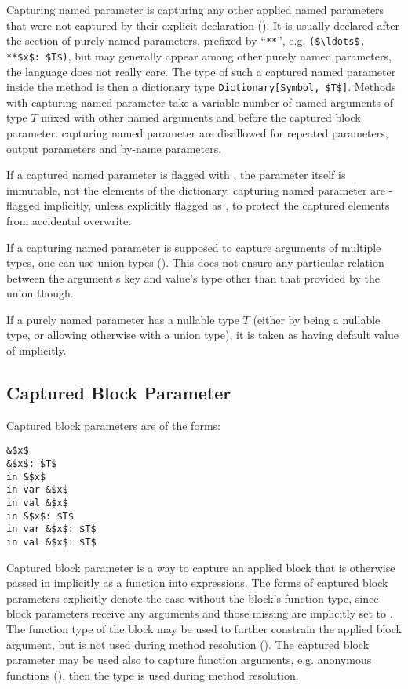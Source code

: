 Capturing named parameter is capturing any other applied named parameters that were not captured by their explicit declaration (). It is usually declared after the section of purely named parameters, prefixed by ``\lstinline!**!'', e.g. \lstinline!($\ldots$, **$x$: $T$)!, but may generally appear among other purely named parameters, the language does not really care. The type of such a captured named parameter inside the method is then a dictionary type \lstinline!Dictionary[Symbol, $T$]!. Methods with capturing named parameter take a variable number of named arguments of type $T$ mixed with other named arguments and before the captured block parameter. capturing named parameter are disallowed for repeated parameters, output parameters and by-name parameters. 

If a captured named parameter is flagged with , the parameter itself is immutable, not the elements of the dictionary. capturing named parameter are -flagged implicitly, unless explicitly flagged as , to protect the captured elements from accidental overwrite. 

If a capturing named parameter is supposed to capture arguments of multiple types, one can use union types (). This does not ensure any particular relation between the argument's key and value's type other than that provided by the union though.

If a purely named parameter has a nullable type $T$ (either by being a nullable type, or allowing otherwise  with a union type), it is taken as having default value of  implicitly. 





\subsection{Captured Block Parameter}
\label{sec:captured-block-parameter}

Captured block parameters are of the forms:
\begin{lstlisting}
&$x$
&$x$: $T$
in &$x$
in var &$x$
in val &$x$
in &$x$: $T$
in var &$x$: $T$
in val &$x$: $T$
\end{lstlisting}

Captured block parameter is a way to capture an applied block that is otherwise passed in implicitly as a function into  expressions. The forms of captured block parameters explicitly denote the case without the block's function type, since block parameters receive any arguments and those missing are implicitly set to . The function type of the block may be used to further constrain the applied block argument, but is not used during method resolution (). The captured block parameter may be used also to capture function arguments, e.g. anonymous functions (), then the type is used during method resolution. 

